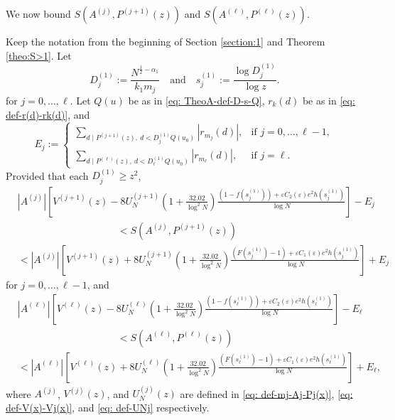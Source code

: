 \documentclass[12pt]{amsart}
\begin{document}
We now bound $S(A^{(j)},P^{(j+1)}(z))$ and $S(A^{(\ell)},P^{(\ell)}(z))$.

\begin{lemma}\label{linearlem}
Keep the notation from the beginning of Section \ref{section:1} and Theorem \ref{theo:S>1}. Let
    \begin{equation*}
        D^{(1)}_j:=\frac{N^{\frac{1}{2}-\alpha_1}}{k_1m_j}\quad\text{and}\quad s^{(1)}_j:=\frac{\log D^{(1)}_j}{\log z}.
    \end{equation*}
    for $j=0,\ldots,\ell$. Let $Q(u)$ be as in \eqref{eq: TheoA-def-D-s-Q}, $r_k(d)$ be as in \eqref{eq: def-r(d)-rk(d)}, and
    \begin{equation*}
        E_j:=
        \begin{cases}
            \sum_{d\mid P^{(j+1)}(z), \:d<D^{(1)}_jQ(u_0)}|r_{m_j}(d)|,&\text{if $j=0,\ldots,\ell-1$},\\
            \sum_{d\mid P^{(\ell)}(z), \:d<D^{(1)}_\ell Q(u_0)}|r_{m_{\ell}}(d)|,&\text{if $j=\ell$}.
        \end{cases}
    \end{equation*}
    Provided that each $D^{(1)}_j\ge z^2$,
    \begin{align*}
        &\left|A^{(j)}\right|\left[V^{(j+1)}(z)-8U_N^{(j+1)}\left(1+\frac{32.02}{\log^2N}\right)\frac{(1-f(s^{(1)}_j))+\varepsilon C_2(\varepsilon)e^2h(s_j^{(1)})}{\log N}\right]-E_j\\
        &\qquad\qquad\qquad\qquad\qquad <S(A^{(j)},P^{(j+1)}(z))\\
        &<\left|A^{(j)}\right|\left[V^{(j+1)}(z)+8U_N^{(j+1)}\left(1+\frac{32.02}{\log^2N}\right)\frac{(F(s^{(1)}_j)-1)+\varepsilon C_1(\varepsilon)e^2h(s_j^{(1)})}{\log N}\right]+E_j
    \end{align*}
    for $j=0,\ldots,\ell-1$, and
    \begin{align*}
        &\left|A^{(\ell)}\right|\left[V^{(\ell)}(z)-8U_N^{(\ell)}\left(1+\frac{32.02}{\log^2N}\right)\frac{(1-f(s_{\ell}^{(1)}))+\varepsilon C_2(\varepsilon)e^2h(s_\ell^{(1)})}{\log N}\right]-E_{\ell}\\
        &\qquad\qquad\qquad\qquad\qquad <S(A^{(\ell)},P^{(\ell)}(z))\\
        &<\left|A^{(\ell)}\right|\left[V^{(\ell)}(z)+8U_N^{(\ell)}\left(1+\frac{32.02}{\log^2N}\right)\frac{(F(s_{\ell}^{(1)})-1)+\varepsilon C_1(\varepsilon)e^2h(s_{\ell}^{(1)})}{\log N}\right]+E_{\ell},
    \end{align*}
    where $A^{(j)}$, $V^{(j)}(z)$, and $U^{(j)}_N(z)$ are defined in \eqref{eq: def-mj-Aj-Pj(x)}, \eqref{eq: def-V(x)-Vj(x)}, and \eqref{eq: def-UNj} respectively.
\end{lemma}
\end{document}
